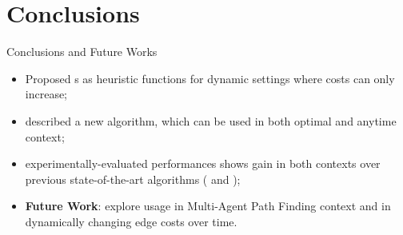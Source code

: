 \section*{Conclusions}

\begin{frame}{Conclusions and Future Works}
    \begin{itemize}
        \item Proposed \CPD{}s as heuristic functions for dynamic settings where costs can only increase;
        \item described a new algorithm, \CPDSearch{} which can be used in both optimal and anytime context;
        \item experimentally-evaluated \CPDSearch{} performances shows gain in both contexts over previous state-of-the-art algorithms (\ALT{} and \AWA{});
        \item \textbf{Future Work}: explore \CPD{} usage in Multi-Agent Path Finding context and in dynamically changing edge costs over time.
    \end{itemize}
\end{frame}

\begin{frame}[plain,c]

\begin{center}
\end{center}



\begin{center}
\end{center}

\end{frame}